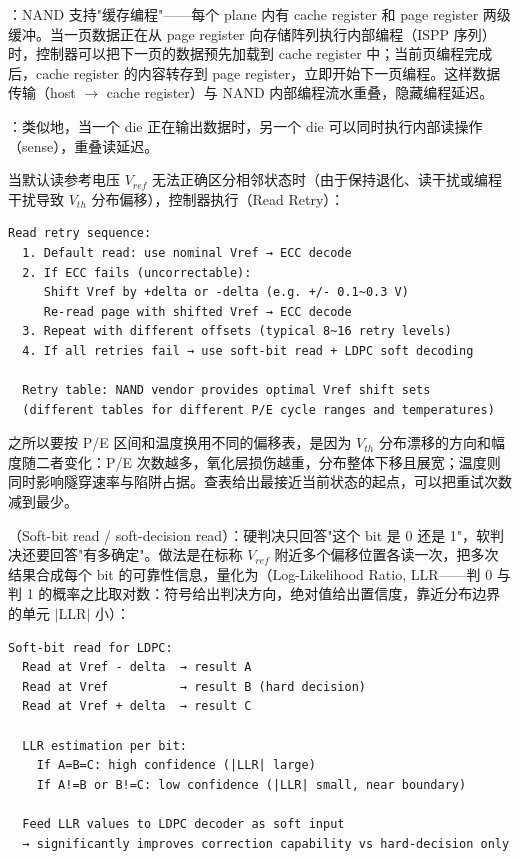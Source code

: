 ：NAND 支持"缓存编程"——每个 plane 内有 cache register 和 page register 两级缓冲。当一页数据正在从 page register 向存储阵列执行内部编程（ISPP 序列）时，控制器可以把下一页的数据预先加载到 cache register 中；当前页编程完成后，cache register 的内容转存到 page register，立即开始下一页编程。这样数据传输（host $\to$ cache register）与 NAND 内部编程流水重叠，隐藏编程延迟。

：类似地，当一个 die 正在输出数据时，另一个 die 可以同时执行内部读操作（sense），重叠读延迟。



当默认读参考电压 $V_{ref}$ 无法正确区分相邻状态时（由于保持退化、读干扰或编程干扰导致 $V_{th}$ 分布偏移），控制器执行（Read Retry）：

\begin{lstlisting}
Read retry sequence:
  1. Default read: use nominal Vref → ECC decode
  2. If ECC fails (uncorrectable):
     Shift Vref by +delta or -delta (e.g. +/- 0.1~0.3 V)
     Re-read page with shifted Vref → ECC decode
  3. Repeat with different offsets (typical 8~16 retry levels)
  4. If all retries fail → use soft-bit read + LDPC soft decoding

  Retry table: NAND vendor provides optimal Vref shift sets
  (different tables for different P/E cycle ranges and temperatures)
\end{lstlisting}

之所以要按 P/E 区间和温度换用不同的偏移表，是因为 $V_{th}$ 分布漂移的方向和幅度随二者变化：P/E 次数越多，氧化层损伤越重，分布整体下移且展宽；温度则同时影响隧穿速率与陷阱占据。查表给出最接近当前状态的起点，可以把重试次数减到最少。

（Soft-bit read / soft-decision read）：硬判决只回答"这个 bit 是 0 还是 1"，软判决还要回答"有多确定"。做法是在标称 $V_{ref}$ 附近多个偏移位置各读一次，把多次结果合成每个 bit 的可靠性信息，量化为（Log-Likelihood Ratio, LLR——判 0 与判 1 的概率之比取对数：符号给出判决方向，绝对值给出置信度，靠近分布边界的单元 $|$LLR$|$ 小）：

\begin{lstlisting}
Soft-bit read for LDPC:
  Read at Vref - delta  → result A
  Read at Vref          → result B (hard decision)
  Read at Vref + delta  → result C

  LLR estimation per bit:
    If A=B=C: high confidence (|LLR| large)
    If A!=B or B!=C: low confidence (|LLR| small, near boundary)

  Feed LLR values to LDPC decoder as soft input
  → significantly improves correction capability vs hard-decision only
\end{lstlisting}

